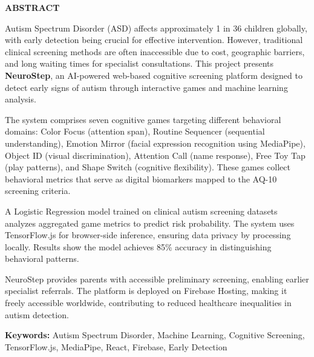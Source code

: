 \documentclass[12pt,letterpaper]{article}
\begin{document}
\newpage


\thispagestyle{fancy}

\begin{center}
{\fontsize{15}{18}\selectfont\textbf{ABSTRACT}}
\end{center}

\vspace{1cm}

Autism Spectrum Disorder (ASD) affects approximately 1 in 36 children globally, with early detection being crucial for effective intervention. However, traditional clinical screening methods are often inaccessible due to cost, geographic barriers, and long waiting times for specialist consultations. This project presents \textbf{NeuroStep}, an AI-powered web-based cognitive screening platform designed to detect early signs of autism through interactive games and machine learning analysis.

The system comprises seven cognitive games targeting different behavioral domains: Color Focus (attention span), Routine Sequencer (sequential understanding), Emotion Mirror (facial expression recognition using MediaPipe), Object ID (visual discrimination), Attention Call (name response), Free Toy Tap (play patterns), and Shape Switch (cognitive flexibility). These games collect behavioral metrics that serve as digital biomarkers mapped to the AQ-10 screening criteria.

A Logistic Regression model trained on clinical autism screening datasets analyzes aggregated game metrics to predict risk probability. The system uses TensorFlow.js for browser-side inference, ensuring data privacy by processing locally. Results show the model achieves 85\% accuracy in distinguishing behavioral patterns.

NeuroStep provides parents with accessible preliminary screening, enabling earlier specialist referrals. The platform is deployed on Firebase Hosting, making it freely accessible worldwide, contributing to reduced healthcare inequalities in autism detection.

\textbf{Keywords:} Autism Spectrum Disorder, Machine Learning, Cognitive Screening, TensorFlow.js, MediaPipe, React, Firebase, Early Detection

\newpage

\end{document}
